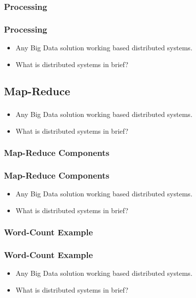
\subsubsection{Processing}
\begin{frame}
\frametitle{Processing}
\begin{itemize}[<+->]
	\item Any Big Data solution working based distributed systems.
	\item What is distributed systems in brief?
\end{itemize}
\end{frame}


\subsection{Map-Reduce}
\begin{frame}
\frametitle{\subsecname}
\begin{itemize}[<+->]
	\item Any Big Data solution working based distributed systems.
	\item What is distributed systems in brief?
\end{itemize}
\end{frame}


\subsubsection{Map-Reduce Components}
\begin{frame}
\frametitle{Map-Reduce Components}
\begin{itemize}[<+->]
	\item Any Big Data solution working based distributed systems.
	\item What is distributed systems in brief?
\end{itemize}
\end{frame}


\subsubsection{Word-Count Example}
\begin{frame}
\frametitle{Word-Count Example}
\begin{itemize}[<+->]
	\item Any Big Data solution working based distributed systems.
	\item What is distributed systems in brief?
\end{itemize}
\end{frame}

